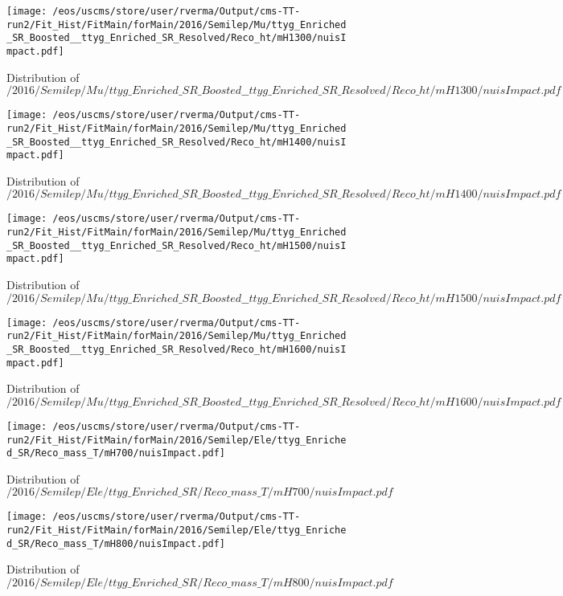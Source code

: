\begin{figure}
\centering
\texttt{[image: /eos/uscms/store/user/rverma/Output/cms-TT-run2/Fit\_Hist/FitMain/forMain/2016/Semilep/Mu/ttyg\_Enriched\_SR\_Boosted\_\_ttyg\_Enriched\_SR\_Resolved/Reco\_ht/mH1300/nuisImpact.pdf]}
\caption{Distribution of $/2016/Semilep/Mu/ttyg\_Enriched\_SR\_Boosted\_\_ttyg\_Enriched\_SR\_Resolved/Reco\_ht/mH1300/nuisImpact.pdf$}
\end{figure}

\begin{figure}
\centering
\texttt{[image: /eos/uscms/store/user/rverma/Output/cms-TT-run2/Fit\_Hist/FitMain/forMain/2016/Semilep/Mu/ttyg\_Enriched\_SR\_Boosted\_\_ttyg\_Enriched\_SR\_Resolved/Reco\_ht/mH1400/nuisImpact.pdf]}
\caption{Distribution of $/2016/Semilep/Mu/ttyg\_Enriched\_SR\_Boosted\_\_ttyg\_Enriched\_SR\_Resolved/Reco\_ht/mH1400/nuisImpact.pdf$}
\end{figure}

\begin{figure}
\centering
\texttt{[image: /eos/uscms/store/user/rverma/Output/cms-TT-run2/Fit\_Hist/FitMain/forMain/2016/Semilep/Mu/ttyg\_Enriched\_SR\_Boosted\_\_ttyg\_Enriched\_SR\_Resolved/Reco\_ht/mH1500/nuisImpact.pdf]}
\caption{Distribution of $/2016/Semilep/Mu/ttyg\_Enriched\_SR\_Boosted\_\_ttyg\_Enriched\_SR\_Resolved/Reco\_ht/mH1500/nuisImpact.pdf$}
\end{figure}

\begin{figure}
\centering
\texttt{[image: /eos/uscms/store/user/rverma/Output/cms-TT-run2/Fit\_Hist/FitMain/forMain/2016/Semilep/Mu/ttyg\_Enriched\_SR\_Boosted\_\_ttyg\_Enriched\_SR\_Resolved/Reco\_ht/mH1600/nuisImpact.pdf]}
\caption{Distribution of $/2016/Semilep/Mu/ttyg\_Enriched\_SR\_Boosted\_\_ttyg\_Enriched\_SR\_Resolved/Reco\_ht/mH1600/nuisImpact.pdf$}
\end{figure}

\begin{figure}
\centering
\texttt{[image: /eos/uscms/store/user/rverma/Output/cms-TT-run2/Fit\_Hist/FitMain/forMain/2016/Semilep/Ele/ttyg\_Enriched\_SR/Reco\_mass\_T/mH700/nuisImpact.pdf]}
\caption{Distribution of $/2016/Semilep/Ele/ttyg\_Enriched\_SR/Reco\_mass\_T/mH700/nuisImpact.pdf$}
\end{figure}

\begin{figure}
\centering
\texttt{[image: /eos/uscms/store/user/rverma/Output/cms-TT-run2/Fit\_Hist/FitMain/forMain/2016/Semilep/Ele/ttyg\_Enriched\_SR/Reco\_mass\_T/mH800/nuisImpact.pdf]}
\caption{Distribution of $/2016/Semilep/Ele/ttyg\_Enriched\_SR/Reco\_mass\_T/mH800/nuisImpact.pdf$}
\end{figure}

